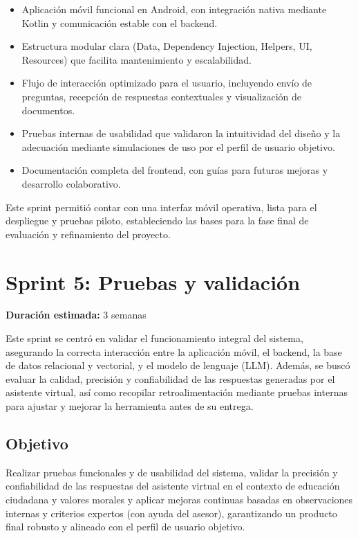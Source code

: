 \begin{itemize}
      \item Aplicación móvil funcional en Android, con integración nativa mediante Kotlin y
            comunicación estable con el backend.
      \item Estructura modular clara (Data, Dependency Injection, Helpers, UI, Resources)
            que facilita mantenimiento y escalabilidad.
      \item Flujo de interacción optimizado para el usuario, incluyendo envío de preguntas,
            recepción de respuestas contextuales y visualización de documentos.
      \item Pruebas internas de usabilidad que validaron la intuitividad del diseño y la
            adecuación mediante simulaciones de uso por el perfil de usuario objetivo.
      \item Documentación completa del frontend, con guías para futuras mejoras y
            desarrollo colaborativo.
\end{itemize}

Este sprint permitió contar con una interfaz móvil operativa, lista para el
despliegue y pruebas piloto, estableciendo las bases para la fase final de
evaluación y refinamiento del proyecto.

\section{Sprint 5: Pruebas y validación}
\textbf{Duración estimada:} 3 semanas

Este sprint se centró en validar el funcionamiento integral del sistema,
asegurando la correcta interacción entre la aplicación móvil, el backend, la
base de datos relacional y vectorial, y el modelo de lenguaje (LLM). Además, se
buscó evaluar la calidad, precisión y confiabilidad de las respuestas generadas
por el asistente virtual, así como recopilar retroalimentación mediante pruebas
internas para ajustar y mejorar la herramienta antes de su entrega.

\subsection{Objetivo}
Realizar pruebas funcionales y de usabilidad del sistema, validar la precisión
y confiabilidad de las respuestas del asistente virtual en el contexto de
educación ciudadana y valores morales y aplicar mejoras continuas basadas en
observaciones internas y criterios expertos (con ayuda del asesor),
garantizando un producto final robusto y alineado con el perfil de usuario
objetivo.

